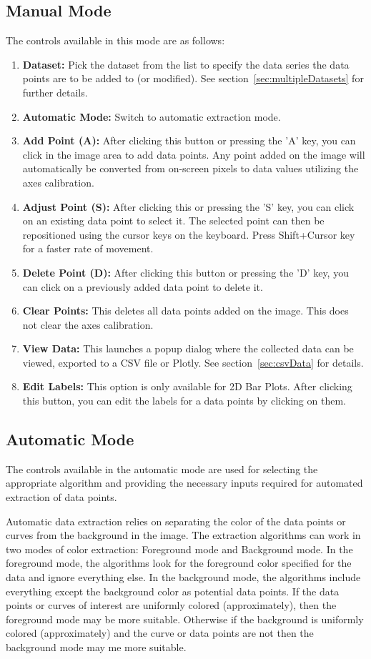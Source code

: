 \documentclass[letterpaper, 11pt]{article}
\begin{document}
\subsection{Manual Mode}
The controls available in this mode are as follows:
\begin{enumerate}
\item{{\bf Dataset: }Pick the dataset from the list to specify the data series the data points are to be added to (or modified). See section~\ref{sec:multipleDatasets} for further details.}
\item{{\bf Automatic Mode: }Switch to automatic extraction mode.}
\item{{\bf Add Point (A): }After clicking this button or pressing the 'A' key, you can click in the image area to add data points. Any point added on the image will automatically be converted from on-screen pixels to data values utilizing the axes calibration.}
\item{{\bf Adjust Point (S): }After clicking this or pressing the 'S' key, you can click on an existing data point to select it. The selected point can then be repositioned using the cursor keys on the keyboard. Press Shift+Cursor key for a faster rate of movement.}
\item{{\bf Delete Point (D): }After clicking this button or pressing the 'D' key, you can click on a previously added data point to delete it.}
\item{{\bf Clear Points: }This deletes all data points added on the image. This does not clear the axes calibration.}
\item{{\bf View Data: }This launches a popup dialog where the collected data can be viewed, exported to a CSV file or Plotly. See section~\ref{sec:csvData} for details.}
\item{{\bf Edit Labels: }This option is only available for 2D Bar Plots. After clicking this button, you can edit the labels for a data points by clicking on them.}
\end{enumerate}

\subsection{Automatic Mode}
The controls available in the automatic mode are used for selecting the appropriate algorithm and providing the necessary inputs required for automated extraction of data points. 

Automatic data extraction relies on separating the color of the data points or curves from the background in the image. The extraction algorithms can work in two modes of color extraction: Foreground mode and Background mode. In the foreground mode, the algorithms look for the foreground color specified for the data and ignore everything else. In the background mode, the algorithms include everything except the background color as potential data points. If the data points or curves of interest are uniformly colored (approximately), then the foreground mode may be more suitable. Otherwise if the background is uniformly colored (approximately) and the curve or data points are not then the background mode may me more suitable.
\end{document}
